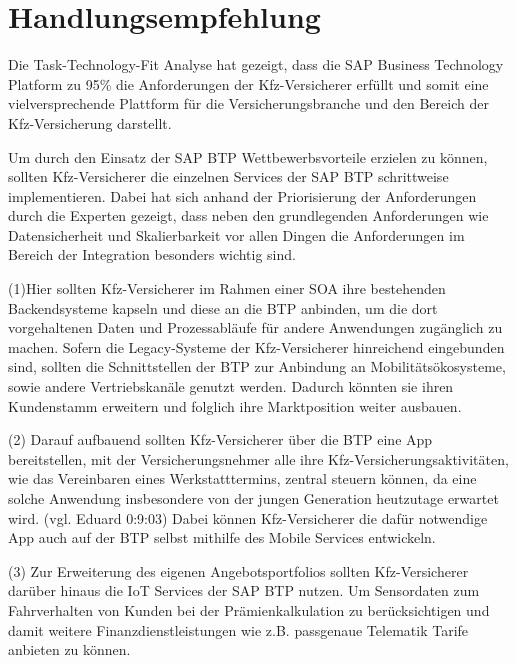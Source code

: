 \chapter{Handlungsempfehlung}


Die Task-Technology-Fit Analyse hat gezeigt, dass die SAP Business Technology Platform zu 95\% die Anforderungen der Kfz-Versicherer erfüllt und somit eine vielversprechende Plattform für die Versicherungsbranche und den Bereich der Kfz-Versicherung darstellt.

Um durch den Einsatz der SAP BTP Wettbewerbsvorteile erzielen zu können, sollten Kfz-Versicherer die einzelnen Services der SAP BTP schrittweise implementieren. Dabei hat sich anhand der Priorisierung der Anforderungen durch die Experten gezeigt, dass neben den grundlegenden Anforderungen wie Datensicherheit und Skalierbarkeit vor allen Dingen die Anforderungen im Bereich der Integration besonders wichtig sind.

(1)Hier sollten Kfz-Versicherer im Rahmen einer SOA ihre bestehenden Backendsysteme kapseln und diese an die BTP anbinden, um die dort vorgehaltenen Daten und Prozessabläufe für andere Anwendungen zugänglich zu machen. Sofern die Legacy-Systeme der Kfz-Versicherer hinreichend eingebunden sind, sollten die Schnittstellen der BTP zur Anbindung an Mobilitätsökosysteme, sowie andere Vertriebskanäle genutzt werden. Dadurch könnten sie ihren Kundenstamm erweitern und folglich ihre Marktposition weiter ausbauen. 

(2) Darauf aufbauend sollten Kfz-Versicherer über die BTP eine App bereitstellen, mit der Versicherungsnehmer alle ihre Kfz-Versicherungsaktivitäten, wie das Vereinbaren eines Werkstatttermins, zentral steuern können, da eine solche Anwendung insbesondere von der jungen Generation heutzutage erwartet wird. (vgl. Eduard 0:9:03)  Dabei können Kfz-Versicherer die dafür notwendige App auch auf der BTP selbst mithilfe des Mobile Services entwickeln.

(3) Zur Erweiterung des eigenen Angebotsportfolios sollten Kfz-Versicherer darüber hinaus die IoT Services der SAP BTP nutzen. Um Sensordaten zum Fahrverhalten von Kunden bei der Prämienkalkulation zu berücksichtigen und damit weitere Finanzdienstleistungen wie z.B. passgenaue Telematik Tarife anbieten zu können.

